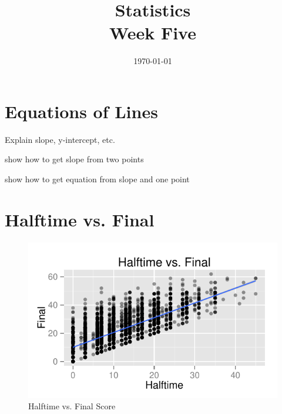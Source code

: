 \documentclass[landscape]{exam}
\title{Statistics \\ Week Five}
\date{\today}
\author{}
\begin{document}
\maketitle
\tableofcontents

  \section{Equations of Lines}
  \begin{itemize*}
    \item Explain slope, y-intercept, etc.
    \item show how to get slope from two points
    \item show how to get equation from slope and one point
  \end{itemize*}

  \section{Halftime vs. Final}

  \begin{figure}[H]
    \centering
    \includegraphics{figures/nfl/ht_vs_final.pdf}
    \caption{Halftime vs. Final Score}
  \end{figure}

\end{document}
